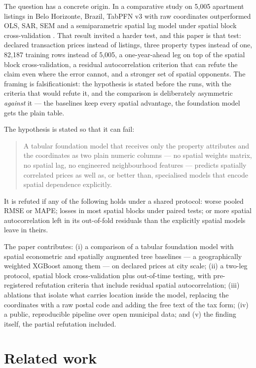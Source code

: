 \documentclass[11pt,a4paper]{article}
\begin{document}
The question has a concrete origin. In a comparative study on 5{,}005 apartment listings in Belo
Horizonte, Brazil, TabPFN v3 with raw coordinates outperformed OLS, SAR, SEM and a
semiparametric spatial lag model under spatial block cross-validation \citep{benvenho2026cead}.
That result invited a harder test, and this paper is that test: declared transaction prices
instead of listings, three property types instead of one, 82{,}187 training rows instead of
5{,}005, a one-year-ahead leg on top of the spatial block cross-validation, a residual
autocorrelation criterion that can refute the claim even where the error cannot, and a stronger
set of spatial opponents. The framing is falsificationist: the hypothesis is stated before the
runs, with the criteria that would refute it, and the comparison is deliberately asymmetric
\emph{against} it --- the baselines keep every spatial advantage, the foundation model gets the
plain table.

The hypothesis is stated so that it can fail:

\begin{quote}
A tabular foundation model that receives only the property attributes and the coordinates as two
plain numeric columns --- no spatial weights matrix, no spatial lag, no engineered neighbourhood
features --- predicts spatially correlated prices as well as, or better than, specialised models
that encode spatial dependence explicitly.
\end{quote}

It is refuted if any of the following holds under a shared protocol: worse pooled RMSE or MAPE;
losses in most spatial blocks under paired tests; or more spatial autocorrelation left in its
out-of-fold residuals than the explicitly spatial models leave in theirs.

The paper contributes: (i) a comparison of a tabular foundation model with spatial econometric
and spatially augmented tree baselines --- a geographically weighted XGBoost among them --- on
declared prices at city scale; (ii) a two-leg protocol, spatial block cross-validation plus
out-of-time testing, with pre-registered refutation criteria that include residual spatial
autocorrelation; (iii) ablations that isolate what carries location inside the model, replacing
the coordinates with a raw postal code and adding the free text of the tax form; (iv) a public,
reproducible pipeline over open municipal data; and (v) the finding itself, the partial
refutation included.

\section{Related work}
\label{sec:related}
\end{document}
